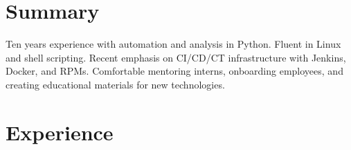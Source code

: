 \documentclass[12pt,letterpaper]{article}
\newcommand{\ResumeSection}[1]{\section*{{\color{MidnightBlue}#1 \sout{\hfill}}}}
\begin{document}

\ResumeSection{Summary}

Ten years experience with automation and analysis in Python. Fluent in Linux and shell scripting. Recent emphasis on CI/CD/CT infrastructure with Jenkins, Docker, and RPMs. Comfortable mentoring interns, onboarding employees, and creating educational materials for new technologies.




\ResumeSection{Experience}
\end{document}
